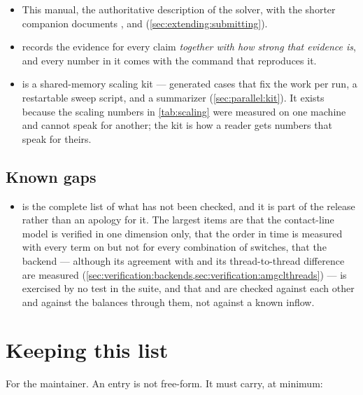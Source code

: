 \begin{itemize}
  \item This manual, the authoritative description of the solver, with the
    shorter companion documents , 
    and  (\cref{sec:extending:submitting}).
  \item {} records the evidence for every claim
    \emph{together with how strong that evidence is}, and every number in it
    comes with the command that reproduces it.
  \item {} is a shared-memory scaling kit --- generated
    cases that fix the work per run, a restartable sweep script, and a
    summarizer (\cref{sec:parallel:kit}). It exists because the scaling
    numbers in \cref{tab:scaling} were measured on one machine and cannot
    speak for another; the kit is how a reader gets numbers that speak for
    theirs.
\end{itemize}

\subsection*{Known gaps}

\begin{itemize}
  \item {} is the complete list of what has not been
    checked, and it is part of the release rather than an apology for it. The
    largest items are that the contact-line model is verified in one dimension
    only, that the order in time is measured with every term on but not for
    every combination of switches, that the
     backend --- although its agreement with  and its
    thread-to-thread difference are measured
    (\cref{sec:verification:backends,sec:verification:amgclthreads}) --- is
    exercised by no test in the suite, and that  and
     are checked against each other and against the balances
    through them, not against a known inflow.
\end{itemize}

\section{Keeping this list}
\label{sec:rev:keeping}

For the maintainer. An entry is not free-form. It must carry, at minimum:

